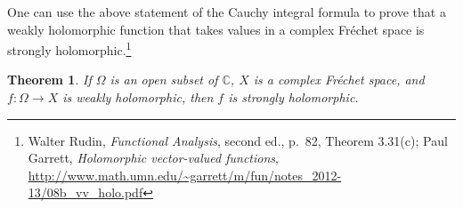 \documentclass{article}
\newtheorem{theorem}{Theorem}
\theoremstyle{definition}
\begin{document}
One can use the above statement of the Cauchy integral formula to prove that a weakly holomorphic function that takes
values in a complex Fr\'echet space is strongly holomorphic.\footnote{Walter Rudin, {\em Functional Analysis}, second ed., p.~82,
Theorem 3.31(c);  Paul Garrett, {\em Holomorphic vector-valued functions}, \url{http://www.math.umn.edu/~garrett/m/fun/notes_2012-13/08b_vv_holo.pdf}}

\begin{theorem}
If $\Omega$ is an open subset of $\mathbb{C}$, $X$ is a complex Fr\'echet space, and
$f:\Omega \to X$ is weakly holomorphic,  then $f$ is strongly holomorphic.
\end{theorem}
\end{document}
